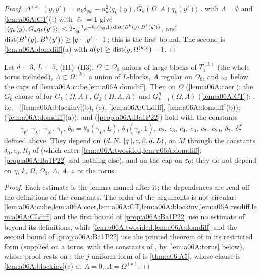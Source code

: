 \begin{proof}
$\Delta^{(k)}(y,y')=a_k\delta_{yy'}-a_k^2\langle q_k(y),G_k(\Omega,A)q_k(y')\rangle$ \cite[(1.14)]{Ba4}.  with $\Lambda=\emptyset$ and \cref{lem:a06A:CT}(i) with $\ell_*=1$ give $|\langle q_k(y),G_kq_k(y')\rangle|\le2\gamma_\emptyset^{-1}e^{-\theta_0(\gamma_\emptyset,1)\operatorname{dist}(B^k(y),B^k(y'))}$, and $\operatorname{dist}(B^k(y),B^k(y'))\ge|y-y'|-1$; this is the first bound. The second is \cref{lem:a06A:domdiff}(a) with $d(y)\ge\operatorname{dist}(y,\Omega^{(k)c})-1$.
\end{proof}

\begin{theorem}\label{thm:a06A:groupA}
Let $d=3$, $L=5$, (H1)--(H3), $\Omega\subset\Omega_0$ unions of large blocks of $T^{(k)}_1$ (the whole torus included), $\Lambda\subset\Omega^{(k)}$ a union of $L$-blocks, $A$ regular on $\Omega_0$, and $\varepsilon_0$ below the caps of \cref{lem:a06A:cube,lem:a06A:domdiff}. Then \cite[(1.8)]{Ba4} on $\Omega$ (\cref{lem:a06A:coer}); the $G_k$ clause of \cite[Cor.~2.3]{Ba4} for $G_k(\Omega,A)$, $G_k(\Omega,\Lambda,A)$ and $G^\eta_{k+1}(\Omega,A)$ (\cref{lem:a06A:CT}); \cite[Prop.~2.3]{Ba1}, i.e.\ \cite[(1.15), (1.16), (1.18), (1.20)]{Ba4} (\cref{lem:a06A:blockinv}(b), (c), \cref{lem:a06A:CLdiff}, \cref{lem:a06A:domdiff}(b)); \cite[(5.5)]{Ba4} (\cref{lem:a06A:domdiff}(a)); and \cite[Prop.~2.2]{Ba1} (\cref{prop:a06A:Ba1P22}) hold with the constants
\[
\gamma_\emptyset,\ \gamma_L,\ \gamma_X,\ \gamma_1,\ \theta_0=\theta_0(\gamma_L,L),\ \theta_0(\gamma_\emptyset,1),\ c_2,\ c_3,\ c_4,\ c_6,\ c_7,\ c_{20},\ \delta_7,\ \delta^S_7
\]
defined above. They depend on $(d,N,\lVert q\rVert,c,\beta,a,L)$, on $M$ through the constants $\delta_0,c_0,R_0$ of \cite[Thm.]{Ba4} (which enter \cref{lem:a06A:twosided,lem:a06A:domdiff}, \cref{prop:a06A:Ba1P22} and nothing else), and on the cap on $\varepsilon_0$; they do not depend on $\eta$, $k$, $\Omega$, $\Omega_0$, $\Lambda$, $A$, $\varepsilon$ or the torus.
\end{theorem}

\begin{proof}
Each estimate is the lemma named after it; the dependences are read off the definitions of the constants. The order of the arguments is not circular: \cref{lem:a06A:cube,lem:a06A:coer,lem:a06A:CT,lem:a06A:blockinv,lem:a06A:resdiff,lem:a06A:CLdiff} and the first bound of \cref{prop:a06A:Ba1P22} use no estimate of \cite{Ba4} beyond its definitions, while \cref{lem:a06A:twosided,lem:a06A:domdiff} and the second bound of \cref{prop:a06A:Ba1P22} use the printed theorem of \cite{Ba4} in its restricted form (supplied on a torus, with the constants of \cite{Ba4}, by \cref{lem:a06A:torus} below), whose proof \cite[Sect.~2]{Ba4} rests on \cite[Lemmas~2.1, 2.2, 2.4]{Ba4}; the $j$-uniform form of \cite[Lemma~2.4]{Ba4} is \cref{thm:a06:A5}, whose clause \cite[(2.37)]{Ba4} is \cref{lem:a06A:blockinv}(c) at $A=0$, $\Lambda=\Omega^{(k)}$.
\end{proof}

